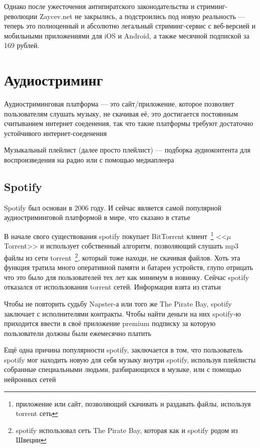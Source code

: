 Однако после ужесточения антипиратского законодательства и стриминг-революции Zaycev.net не закрылись, а подстроились под новую реальность --- теперь это полноценный и абсолютно легальный стриминг-сервис с веб-версией и мобильными приложениями для iOS и Android, а также месячной подпиской за 169 рублей.

\section{Аудиостриминг}
Аудиостриминговая платформа --- это сайт/приложение, которое позволяет пользователям слушать музыку, не скачивая её, это достигается постоянным считыванием интернет соеденения, так что такие платформы требуют достаточно устойчивого интернет-соеденения

Музыкальный плейлист (далее просто плейлист) --- подборка аудиоконтента для воспроизведения на радио или с помощью медиаплеера


\subsection{Spotify}

Spotify был основан в 2006 году. И сейчас является самой популярной аудиостриминговой платформой в мире, что сказано в статье~\cite{cnn-best-music-platform}

В начале свого существования spotify покупает BitTorrent клиент~\footnote{приложение или сайт, позволяющий скачивать и раздавать файлы, используя torrent сеть} <<\(\mu\)Torrent>> и использует собственный алгоритм, позволяющий слушать mp3 файлы из сети torrent~\footnote{spotify использовал сеть The Pirate Bay, которая как и spotify родом из Швеции}, который тоже находи, не скачивая файлов. Хоть эта функция тратила много оперативной памяти и батареи устройств, глупо отрицать что это было для пользователей тех лет как минимум в новинку.  Сейчас spotify отказался от использования torrent сетей.  Информация взята из статьи~\cite{spotify-success-story}

Чтобы не повторить судьбу Napster-а или того же The Pirate Bay, spotify заключает с исполнителями контракты.  Чтобы найти деньги на них spotify-ю приходится ввести в своё приложение premium подписку за которую пользователи должны были ежемесячно платить

Ещё одна причина популярности spotify, заключается в том, что пользователь spotify мог находить новую для себя музыку внутри spotify, используя плейлисты собранные специальными людьми, разбирающихся в музыке, или с помощью нейронных сетей

